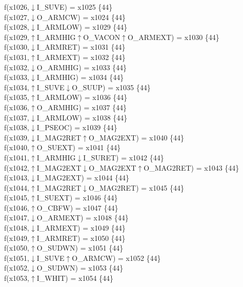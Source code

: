 f(x1026,$\downarrow$I\_SUVE) = x1025 \{44\} \\  
f(x1027,$\downarrow$O\_ARMCW) = x1024 \{44\} \\  
f(x1028,$\downarrow$I\_ARMLOW) = x1029 \{44\} \\  
f(x1029,$\uparrow$I\_ARMHIG$\uparrow$O\_VACON$\uparrow$O\_ARMEXT) = x1030 \{44\} \\  
f(x1030,$\downarrow$I\_ARMRET) = x1031 \{44\} \\  
f(x1031,$\uparrow$I\_ARMEXT) = x1032 \{44\} \\  
f(x1032,$\downarrow$O\_ARMHIG) = x1033 \{44\} \\  
f(x1033,$\downarrow$I\_ARMHIG) = x1034 \{44\} \\  
f(x1034,$\uparrow$I\_SUVE$\downarrow$O\_SUUP) = x1035 \{44\} \\  
f(x1035,$\uparrow$I\_ARMLOW) = x1036 \{44\} \\  
f(x1036,$\uparrow$O\_ARMHIG) = x1037 \{44\} \\  
f(x1037,$\downarrow$I\_ARMLOW) = x1038 \{44\} \\  
f(x1038,$\downarrow$I\_PSEOC) = x1039 \{44\} \\  
f(x1039,$\downarrow$I\_MAG2RET$\uparrow$O\_MAG2EXT) = x1040 \{44\} \\  
f(x1040,$\uparrow$O\_SUEXT) = x1041 \{44\} \\  
f(x1041,$\uparrow$I\_ARMHIG$\downarrow$I\_SURET) = x1042 \{44\} \\  
f(x1042,$\uparrow$I\_MAG2EXT$\downarrow$O\_MAG2EXT$\uparrow$O\_MAG2RET) = x1043 \{44\} \\  
f(x1043,$\downarrow$I\_MAG2EXT) = x1044 \{44\} \\  
f(x1044,$\uparrow$I\_MAG2RET$\downarrow$O\_MAG2RET) = x1045 \{44\} \\  
f(x1045,$\uparrow$I\_SUEXT) = x1046 \{44\} \\  
f(x1046,$\uparrow$O\_CBFW) = x1047 \{44\} \\  
f(x1047,$\downarrow$O\_ARMEXT) = x1048 \{44\} \\  
f(x1048,$\downarrow$I\_ARMEXT) = x1049 \{44\} \\  
f(x1049,$\uparrow$I\_ARMRET) = x1050 \{44\} \\  
f(x1050,$\uparrow$O\_SUDWN) = x1051 \{44\} \\  
f(x1051,$\downarrow$I\_SUVE$\uparrow$O\_ARMCW) = x1052 \{44\} \\  
f(x1052,$\downarrow$O\_SUDWN) = x1053 \{44\} \\  
f(x1053,$\uparrow$I\_WHIT) = x1054 \{44\} \\  
